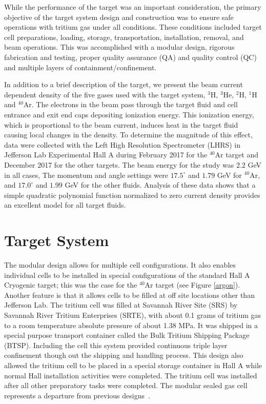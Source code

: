 \documentclass[review,numbers,sort&compress]{elsarticle}
\begin{document}
While the performance of the target was an important consideration, the primary objective of the target system design and construction 
was to ensure safe operations with tritium gas under all conditions.   These conditions included 
target cell preparations, loading, storage, transportation, installation, removal, and beam operations. This was accomplished with a 
modular design, rigorous fabrication and testing, proper quality assurance (QA) and quality control (QC) and multiple layers of 
containment/confinement.    

 
In addition to a brief description of the target, we present the beam current dependent density of the five gases used 
with the target system, $^{3}$H, $^{3}$He, $^{2}$H, $^{1}$H and $^{40}$Ar. The electrons in the beam pass through the 
target fluid and cell entrance and exit end caps depositing ionization energy. This ionization energy, which is proportional 
to the beam current, induces heat in the target fluid causing local changes in the density. To determine the magnitude of this 
effect, data were collected with the Left High Resolution Spectrometer (LHRS) in Jefferson Lab Experimental Hall A during 
February 2017 for the $^{40}$Ar target and December 2017 for the other targets. The beam energy for the study was $2.2$ GeV 
in all cases, The momentum and angle settings were $17.5 ^\circ $ and $1.79$ GeV for $^{40}$Ar, and $17.0 ^\circ $ and $1.99$ GeV 
for the other fluids. Analysis of these data shows that a simple quadratic polynomial function normalized to zero current density 
provides an excellent model for all target fluids.

\section{Target System}

The modular design allows for multiple cell configurations. It also enables individual cells to be installed in special configurations 
of the standard Hall A Cryogenic target; this was the case for the $^{40}$Ar target (see Figure \ref{argon}). Another feature is that 
it allows cells to be filled at off site locations other than Jefferson Lab.  The tritium cell was filled at Savannah River 
Site (SRS) by Savannah River Tritium Enterprises (SRTE), with about 0.1 grams
of tritium gas to a room temperature absolute  pressure of about 1.38 MPa. It was shipped 
in a special purpose transport container called the Bulk Tritium Shipping Package (BTSP). Including the cell this system provided 
continuous triple layer confinement though out the shipping and handling
process. This design also allowed the tritium cell to be placed  in a special
storage container in Hall A while normal Hall installation activities were
completed. The tritium cell was installed after all other preparatory tasks were completed.     
The modular sealed gas cell represents a departure from previous designs~\cite{Beck:1989bi}. 
\end{document}
